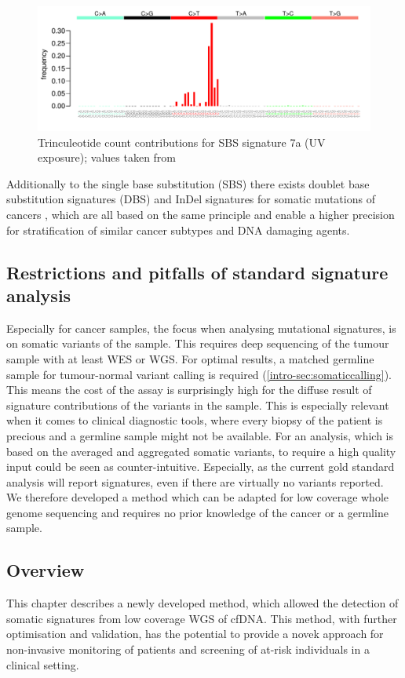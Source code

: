 \begin{figure}[!ht]
\centering
\includegraphics[width=.99\linewidth]{Figures/MisMatchFinder/SBS7aSignature.pdf}
\caption[Trinculeotide count contributions for single base substitution (SBS) signature 7a]{Trinculeotide count contributions for SBS signature 7a (UV exposure); values taken from \protect\textcite{Alexandrov2020}}\label{fig:sig7a}
\end{figure}

Additionally to the single base substitution (SBS) there exists doublet base substitution signatures (DBS) and InDel signatures for somatic mutations of cancers \cite{Alexandrov2020}, which are all based on the same principle and enable a higher precision for stratification of similar cancer subtypes and DNA damaging agents.

\subsection{Restrictions and pitfalls of standard signature analysis}
Especially for cancer samples, the focus when analysing mutational signatures, is on somatic variants of the sample. This requires deep sequencing of the tumour sample with at least WES or WGS. For optimal results, a  matched germline sample for tumour-normal variant calling is required (\autoref{intro-sec:somaticcalling}). This means the cost of the assay is surprisingly high for the diffuse result of signature contributions of the variants in the sample. This is especially relevant when it comes to clinical diagnostic tools, where every biopsy of the patient is precious and a germline sample might not be available. For an analysis, which is based on the averaged and aggregated somatic variants, to require a high quality input could be seen as counter-intuitive. Especially, as the current gold standard analysis will report signatures, even if there are virtually no variants reported. We therefore developed a method which can be adapted for low coverage whole genome sequencing and requires no prior knowledge of the cancer or a germline sample.

\subsection{Overview}
 This chapter describes a newly developed method, which allowed the detection of somatic signatures from low coverage WGS of cfDNA. This method, with further optimisation and validation, has the potential to provide a novek approach for non-invasive monitoring of patients and  screening of at-risk individuals in a clinical setting.
